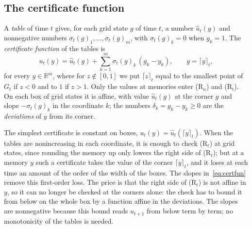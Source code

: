 \documentclass[11pt]{amsart}
\theoremstyle{definition}
\numberwithin{equation}{section}
\newcommand{\R}{\mathbb{R}}
\newcommand{\ceil}[2]{\lceil #1\rceil_{#2}}
\begin{document}
\subsection{The certificate function}
A \emph{table} of time $t$ gives, for each grid state $g$ of time $t$, a number $\hat u_t(g)$ and nonnegative numbers $\sigma_t(g)_1,\dots,\sigma_t(g)_m$, with $\sigma_t(g)_k=0$ when $g_k=1$. The \emph{certificate function} of the tables is
\begin{equation}\label{eq:certfun}
u_t(y)=\hat u_t(g)+\sum_{k=1}^m\sigma_t(g)_k\,(g_k-y_k),\qquad g=\ceil{y}{t},
\end{equation}
for every $y\in\R^m$, where for $z\notin[0,1]$ we put $\ceil{z}{t}$ equal to the smallest point of $G_t$ if $z<0$ and to $1$ if $z>1$. Only the values at memories enter (R$_n$) and (R$_t$). On each box of grid states it is affine, with value $\hat u_t(g)$ at the corner $g$ and slope $-\sigma_t(g)_k$ in the coordinate $k$; the numbers $\delta_k=g_k-y_k\ge0$ are the \emph{deviations} of $y$ from its corner.

The simplest certificate is constant on boxes, $u_t(y)=\hat u_t(\ceil{y}{t})$. When the tables are nonincreasing in each coordinate, it is enough to check (R$_t$) at grid states, since rounding the memory up only lowers the right side of (R$_t$); but at a memory $y$ such a certificate takes the value of the corner $\ceil{y}{t}$, and it loses at each time an amount of the order of the width of the boxes. The slopes in~\eqref{eq:certfun} remove this first-order loss. The price is that the right side of (R$_t$) is not affine in $y$, so it can no longer be checked at the corners alone: the check has to bound it from below on the whole box by a function affine in the deviations. The slopes are nonnegative because this bound reads $u_{t+1}$ from below term by term; no monotonicity of the tables is needed.
\end{document}

